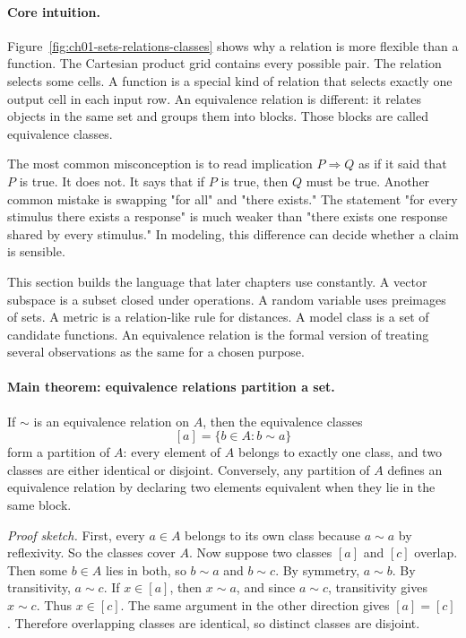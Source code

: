 \paragraph{Core intuition.}
Figure~\ref{fig:ch01-sets-relations-classes} shows why a relation is more flexible than a function. The Cartesian product grid contains every possible pair. The relation selects some cells. A function is a special kind of relation that selects exactly one output cell in each input row. An equivalence relation is different: it relates objects in the same set and groups them into blocks. Those blocks are called equivalence classes.

The most common misconception is to read implication \(P\Rightarrow Q\) as if it said that \(P\) is true. It does not. It says that if \(P\) is true, then \(Q\) must be true. Another common mistake is swapping "for all" and "there exists." The statement "for every stimulus there exists a response" is much weaker than "there exists one response shared by every stimulus." In modeling, this difference can decide whether a claim is sensible.

This section builds the language that later chapters use constantly. A vector subspace is a subset closed under operations. A random variable uses preimages of sets. A metric is a relation-like rule for distances. A model class is a set of candidate functions. An equivalence relation is the formal version of treating several observations as the same for a chosen purpose.

\paragraph{Main theorem: equivalence relations partition a set.}
If \(\sim\) is an equivalence relation on \(A\), then the equivalence classes
\[
[a]=\{b\in A:b\sim a\}
\]
form a partition of \(A\): every element of \(A\) belongs to exactly one class, and two classes are either identical or disjoint. Conversely, any partition of \(A\) defines an equivalence relation by declaring two elements equivalent when they lie in the same block.

\emph{Proof sketch.} First, every \(a\in A\) belongs to its own class because \(a\sim a\) by reflexivity. So the classes cover \(A\). Now suppose two classes \([a]\) and \([c]\) overlap. Then some \(b\in A\) lies in both, so \(b\sim a\) and \(b\sim c\). By symmetry, \(a\sim b\). By transitivity, \(a\sim c\). If \(x\in[a]\), then \(x\sim a\), and since \(a\sim c\), transitivity gives \(x\sim c\). Thus \(x\in[c]\). The same argument in the other direction gives \([a]=[c]\). Therefore overlapping classes are identical, so distinct classes are disjoint.

